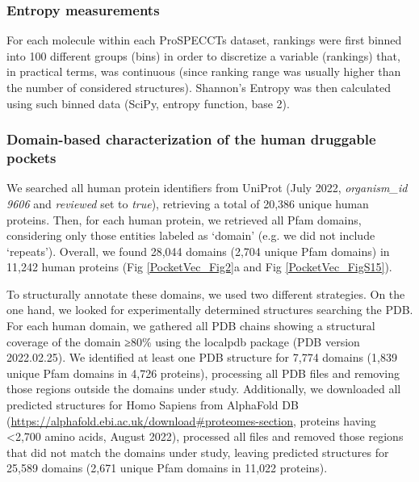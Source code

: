 \subsubsection{Entropy measurements}

For each molecule within each ProSPECCTs dataset, rankings were first binned into 100 different groups (bins) in order to discretize a variable (rankings) that, in practical terms, was continuous (since ranking range was usually higher than the number of considered structures). Shannon's Entropy was then calculated using such binned data (SciPy\cite{virtanen_scipy_2020}, entropy function, base 2).

\subsubsection{Domain-based characterization of the human druggable pockets}

We searched all human protein identifiers from UniProt (July 2022, \textit{organism\_id 9606} and \textit{reviewed} set to \textit{true}), retrieving a total of 20,386 unique human proteins\cite{the_uniprot_consortium_uniprot_2023}. Then, for each human protein, we retrieved all Pfam domains\cite{mistry_pfam_2021}, considering only those entities labeled as ‘domain’ (e.g. we did not include ‘repeats’). Overall, we found 28,044 domains (2,704 unique Pfam domains) in 11,242 human proteins (Fig \ref{PocketVec_Fig2}a and Fig \ref{PocketVec_FigS15}).

To structurally annotate these domains, we used two different strategies. On the one hand, we looked for experimentally determined structures searching the PDB\cite{goodsell_rcsb_2020}. For each human domain, we gathered all PDB chains showing a structural coverage of the domain ≥80\% using the localpdb package\cite{ludwiczak_localpdb_2022} (PDB version 2022.02.25). We identified at least one PDB structure for 7,774 domains (1,839 unique Pfam domains in 4,726 proteins), processing all PDB files and removing those regions outside the domains under study. Additionally, we downloaded all predicted structures for Homo Sapiens from AlphaFold DB (\href{https://alphafold.ebi.ac.uk/download\#proteomes-section}{https://alphafold.ebi.ac.uk/download\#proteomes-section}, proteins having <2,700 amino acids, August 2022), processed all files and removed those regions that did not match the domains under study, leaving predicted structures for 25,589 domains (2,671 unique Pfam domains in 11,022 proteins).

